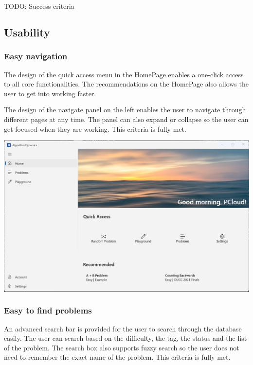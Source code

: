 \documentclass[a4paper]{report}
\begin{document}
TODO: Success criteria

\subsection{Usability}

\subsubsection{Easy navigation}

The design of the quick access menu in the HomePage enables a one-click access to all core functionalities. The recommendations on the HomePage also allows the user to get into working faster.

The design of the navigate panel on the left enables the user to navigate through different pages at any time. The panel can also expand or collapse so the user can get focused when they are working. This criteria is fully met.

\includegraphics[width=\textwidth, height=\textheight, keepaspectratio]{HomePage-Final}

\subsubsection{Easy to find problems}

An advanced search bar is provided for the user to search through the database easily. The user can search based on the difficulty, the tag, the status and the list of the problem. The search box also supports fuzzy search so the user does not need to remember the exact name of the problem. This criteria is fully met.
\end{document}
